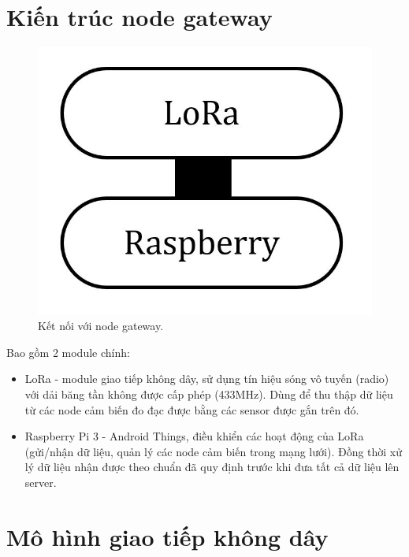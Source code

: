 \section{Kiến trúc node gateway}

\begin{center}
    \begin{figure}[htp]
    \begin{center}
     \includegraphics[scale=0.3]{image2/gateway.JPG}
    \end{center}
    \caption{Kết nối với node gateway.}
    \end{figure}
\end{center}

Bao gồm 2 module chính:
\begin{itemize}
    \item LoRa - module giao tiếp không dây, sử dụng tín hiệu sóng vô tuyến (radio) với dải băng tần không được cấp phép (433MHz). Dùng để thu thập dữ liệu từ các node cảm biến đo đạc được bằng các sensor được gắn trên đó.
    \item Raspberry Pi 3 - Android Things, điều khiển các hoạt động của LoRa (gửi/nhận dữ liệu, quản lý các node cảm biến trong mạng lưới). Đồng thời xử lý dữ liệu nhận được theo chuẩn đã quy định trước khi đưa tất cả dữ liệu lên server.
\end{itemize}
 
\section{Mô hình giao tiếp không dây}
